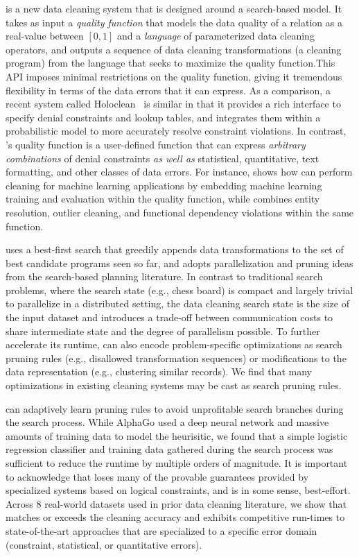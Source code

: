 \sys is a new data cleaning system that is designed around a search-based model. It takes as input a {\it quality function} that models the data quality of a relation as a real-value between $[0,1]$ and a {\it language} of parameterized data cleaning operators, and outputs a sequence of data cleaning transformations (a cleaning program) from the language that seeks to maximize the quality function.This API imposes minimal restrictions on the quality function, giving it tremendous flexibility in terms of the data errors that it can express.   As a comparison, a recent system called Holoclean~\cite{rekatsinas2017holoclean} is similar in that it provides a rich interface to specify denial constraints and lookup tables, and integrates them within a probabilistic model to more accurately resolve constraint violations.  In contrast, \sys's quality function is a user-defined function that can express {\it arbitrary combinations} of denial constraints {\it as well as} statistical, quantitative, text formatting, and other classes of data errors.  For instance,  shows how \sys can perform cleaning for machine learning applications by embedding machine learning training and evaluation within the quality function, while  combines entity resolution, outlier cleaning, and functional dependency violations within the same function.  


\sys uses a best-first search that greedily appends data transformations to the set of best candidate programs seen so far, and adopts parallelization and pruning ideas from the search-based planning literature.  In contrast to traditional search problems, where the search state (e.g., chess board) is compact and largely trivial to parallelize in a distributed setting, the data cleaning search state is the size of the input dataset and introduces a trade-off between communication costs to share intermediate state and the degree of parallelism possible.  
To further accelerate its runtime, \sys can also encode problem-specific optimizations as search pruning rules (e.g., disallowed transformation sequences) or modifications to the data representation (e.g., clustering similar records).  We find that many optimizations in existing cleaning systems may be cast as search pruning rules.

\sys can adaptively learn pruning rules to avoid unprofitable search branches during the search process.
While AlphaGo used a deep neural network and massive amounts of training data to model the heurisitic, we found that a simple logistic regression classifier and training data gathered during the search process was sufficient to reduce the runtime by multiple orders of magnitude. 
It is important to acknowledge that \sys loses many of the provable guarantees provided by specialized systems based on logical constraints, and is in some sense, best-effort.  
Across 8 real-world datasets used in prior data cleaning literature, we show that \sys matches or exceeds the cleaning accuracy and exhibits competitive run-times to state-of-the-art approaches that are specialized to a specific error domain (constraint, statistical, or quantitative errors).  

